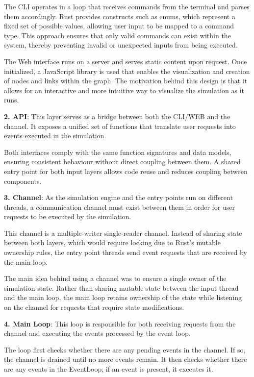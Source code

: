 The CLI operates in a loop that receives commands from the terminal and parses them accordingly. Rust provides constructs such as enums, which represent a fixed set of possible values, allowing user input to be mapped to a command type. This approach ensures that only valid commands can exist within the system, thereby preventing invalid or unexpected inputs from being executed. 

The Web interface runs on a server and serves static content upon request. Once initialized, a JavaScript library is used that enables the visualization and creation of nodes and links within the graph. The motivation behind this design is that it allows for an interactive and more intuitive way to visualize the simulation as it runs.

\textbf{2. API}: This layer serves as a bridge between both the CLI/WEB and the channel. It exposes a unified set of functions that translate user requests into events executed in the simulation. 

Both interfaces comply with the same function signatures and data models, ensuring consistent behaviour without direct coupling between them. A shared entry point for both input layers allows code reuse and reduces coupling between components.

\textbf{3. Channel}: As the simulation engine and the entry points run on different threads, a communication channel must exist between them in order for user requests to be executed by the simulation.

This channel is a multiple-writer single-reader channel. Instead of sharing state between both layers, which would require locking due to Rust's mutable ownership rules, the entry point threads send event requests that are received by the main loop.

The main idea behind using a channel was to ensure a single owner of the simulation state. Rather than sharing mutable state between the input thread and the main loop, the main loop retains ownership of the state while listening on the channel for requests that require state modifications.

\textbf{4. Main Loop}: This loop is responsible for both receiving requests from the channel and executing the events processed by the event loop.

The loop first checks whether there are any pending events in the channel. If so, the channel is drained until no more events remain. It then checks whether there are any events in the EventLoop; if an event is present, it executes it.

